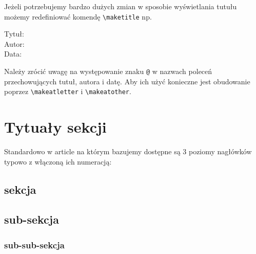 \documentclass[fontSize=10pt,extra]{pdfArticle}
\begin{document}
Jeżeli potrzebujemy bardzo dużych zmian w sposobie wyświetlania tutułu możemy redefiniować komendę \Verb$\maketitle$ np.
\begin{Example}
\makeatletter %
\renewcommand{\maketitle}{
	Tytuł: \textcolor{red}{\@title}\\
	Autor: \textcolor{blue}{\@author}\\
	Data: \textcolor{green}{\@date}
}
\makeatother %
\maketitle
\end{Example}

Należy zrócić uwagę na występowanie znaku \Verb$@$ w nazwach poleceń przechowujących tutuł, autora i datę.
Aby ich użyć konieczne jest obudowanie poprzez \Verb$\makeatletter$ i \Verb$\makeatother$.

\section{Tytuały sekcji}

\label{test1}

Standardowo w article na którym bazujemy dostępne są 3 poziomy nagłówków typowo z włączoną ich numeracją:\vspace{-20pt}
\begin{Example}
\section{sekcja}
\subsection{sub-sekcja}
\subsubsection{sub-sub-sekcja}
\end{Example}
\end{document}

